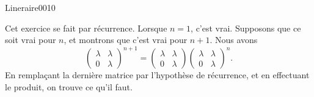 \begin{corrige}{Lineraire0010}

	Cet exercice se fait par récurrence. Lorsque $n=1$, c'est vrai. Supposons que ce soit vrai pour $n$, et montrons que c'est vrai pour $n+1$. Nous avons
	\begin{equation}
		\begin{pmatrix}
			\lambda	&	\lambda	\\ 
			0	&	\lambda	
		\end{pmatrix}^{n+1}
		=
		\begin{pmatrix}
			\lambda	&	\lambda	\\ 
			0	&	\lambda	
		\end{pmatrix}
		\begin{pmatrix}
			\lambda	&	\lambda	\\ 
			0	&	\lambda	
		\end{pmatrix}^n.
	\end{equation}
	En remplaçant la dernière matrice par l'hypothèse de récurrence, et en effectuant le produit, on trouve ce qu'il faut.

\end{corrige}
